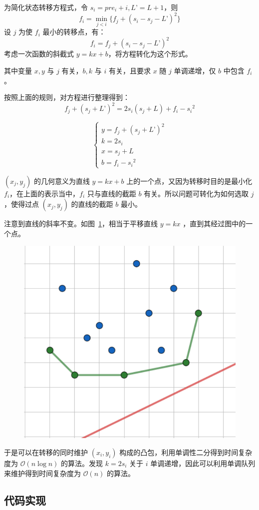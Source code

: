 为简化状态转移方程式，令 \(s_i=pre_i+i,L’=L+1\)，则 \[
f_i=\min_{j<i}\{f_j+(s_i-s_j-L’)^2\}
\] 设 \(j\) 为使 \(f_i\) 最小的转移点，有： \[
f_i=f_j+(s_i-s_j-L’)^2
\] 考虑一次函数的斜截式 \(y=kx+b\)，将方程转化为这个形式。

其中变量 \(x, y\) 与 \(j\) 有关，\(b, k\) 与 \(i\) 有关，且要求 \(x\) 随
\(j\) 单调递增，仅 \(b\) 中包含 \(f_i\)。

按照上面的规则，对方程进行整理得到： \[
f_j+(s_j+L’)^2=2s_i(s_j+L)+f_i-{s_i}^2
\]

\[
\left\{
\begin{array}{lr}
y = f_j+(s_j+L’)^2\\
k = 2s_i\\
x = s_j+L\\
b = f_i-{s_i}^2
\end{array}
\right.
\]

\((x_j, y_j)\) 的几何意义为直线 \(y=kx+b\)
上的一个点，又因为转移时目的是最小化 \(f_i\)，在上面的表示当中，\(f_i\)
只与直线的截距 \(b\) 有关。所以问题可转化为如何选取 \(j\) ，使得过点
\((x_j, y_j)\) 的直线的截距 \(b\) 最小。

注意到直线的斜率不变。如图~\ref{fig:fig1}，相当于平移直线 \(y=kx\) ，直到其经过图中的一个点。

\begin{figure}[H]
	\centering
	\begin{framed}
	\includegraphics[width=0.5\linewidth]{fig/fig1.pdf}
	\end{framed}
	\caption{}
	\label{fig:fig1}
\end{figure}



于是可以在转移的同时维护 \((x_i,y_i)\)
构成的凸包，利用单调性二分得到时间复杂度为 \(\mathcal{O}(n\log n)\)
的算法。发现 \(k=2s_i\) 关于 \(i\)
单调递增，因此可以利用单调队列来维护得到时间复杂度为 \(\mathcal{O}(n)\)
的算法。

\subsection{代码实现}

\inputminted[frame=lines, numbers=left, fontsize=\scriptsize, tabsize=4, breaklines=true]{c++}{code/6.cpp}